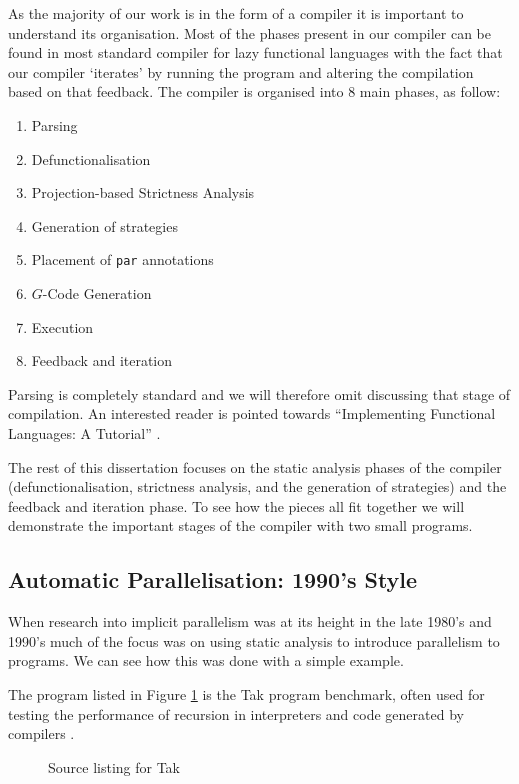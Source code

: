 As the majority of our work is in the form of a compiler it is important to
understand its organisation. Most of the phases present in our compiler can be
found in most standard compiler for lazy functional languages with the fact
that our compiler `iterates' by running the program and altering the
compilation based on that feedback. The compiler is organised into 8 main
phases, as follow:

\begin{enumerate}
    \item Parsing
    \item Defunctionalisation
    \item Projection-based Strictness Analysis
    \item Generation of strategies
    \item Placement of \verb-par- annotations
    \item $G$-Code Generation
    \item Execution
    \item Feedback and iteration
\end{enumerate}

Parsing is completely standard and we will therefore omit discussing that stage
of compilation. An interested reader is pointed towards ``Implementing
Functional Languages: A Tutorial'' \citep{PeytonJones:IFL}.


The rest of this dissertation focuses on the static analysis phases of the
compiler (defunctionalisation, strictness analysis, and the generation of
strategies) and the feedback and iteration phase. To see how the pieces
all fit together we will demonstrate the important stages of the compiler
with two small programs.

\subsection{Automatic Parallelisation: 1990's Style}

When research into implicit parallelism was at its height in the late 1980's and 1990's
much of the focus was on using static analysis to introduce parallelism to programs.
We can see how this was done with a simple example.

The program listed in Figure \ref{fig:tak} is the Tak program benchmark, often used
for testing the performance of recursion in interpreters and code generated by
compilers \citep{ExamplesOfRecursion}.

\begin{figure}
  
\caption{Source listing for Tak}
\label{fig:tak}
\end{figure}

